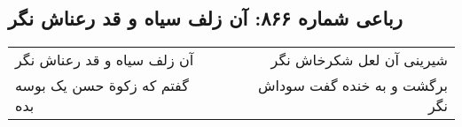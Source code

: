 \begin{center}
\section*{رباعی شماره ۸۶۶: آن زلف سیاه و قد رعناش نگر}
\label{sec:0866}
\begin{longtable}{l p{0.5cm} r}
آن زلف سیاه و قد رعناش نگر
&&
شیرینی آن لعل شکرخاش نگر
\\
گفتم که زکوة حسن یک بوسه بده
&&
برگشت و به خنده گفت سوداش نگر
\\
\end{longtable}
\end{center}
